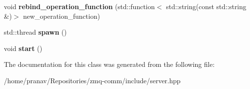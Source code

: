 \begin{DoxyCompactItemize}
\item 
void {\bfseries rebind\+\_\+operation\+\_\+function} (std\+::function$<$ std\+::string(const std\+::string \&)$>$ new\+\_\+operation\+\_\+function)\hypertarget{classServer_add9087ce6bbe672d22d4d80565696653}{}\label{classServer_add9087ce6bbe672d22d4d80565696653}

\item 
std\+::thread {\bfseries spawn} ()\hypertarget{classServer_afaa5fab09f6a4582ae4b29232ebd9f76}{}\label{classServer_afaa5fab09f6a4582ae4b29232ebd9f76}

\item 
void {\bfseries start} ()\hypertarget{classServer_a7eac07d2582fa01c2671362efa955b31}{}\label{classServer_a7eac07d2582fa01c2671362efa955b31}

\end{DoxyCompactItemize}


The documentation for this class was generated from the following file\+:\begin{DoxyCompactItemize}
\item 
/home/pranav/\+Repositories/zmq-\/comm/include/server.\+hpp\end{DoxyCompactItemize}
